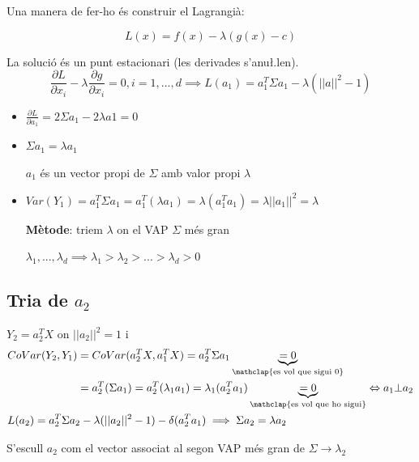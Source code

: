 Una manera de fer-ho és construir el Lagrangià:

$$  
L(x) = f(x) - \lambda(g(x) - c)  
$$

La solució és un punt estacionari (les derivades s'anu\l.len).
$$  
\frac{\partial L}{\partial x_i} - \lambda \frac{\partial g}{\partial x_i} = 0, i = 1, ..., d \implies 
L(a_1) = a_1^T\Sigma a_1 - \lambda(||a||^2 - 1)  
$$

\begin{itemize}
	\item $\frac{\partial L}{\partial a_1} = 2\Sigma a_1 - 2\lambda a1 = 0$
	\item $\Sigma a_1 = \lambda a_1$
	
	$a_1$ és un vector propi de $\Sigma$ amb valor propi $\lambda$
	\item $Var(Y_1) = a_1^T\Sigma a_1=a_1^T(\lambda a_1) = \lambda(a_1^T a_1) = \lambda ||a_1||^2 = \lambda$
	
	\textbf{Mètode}: triem $\lambda$ on el VAP $\Sigma$ més gran
	
	$\lambda_1, ..., \lambda_d \implies \lambda_1 > \lambda_2 > ... > \lambda_d > 0$
\end{itemize}

\subsection{Tria de $a_2$}

$Y_2 = a_2^TX$ on $||a_2||^2 = 1$ i 
\begin{align*}
	& 
	\begin{aligned}
		CoVar(Y_2, Y_1) &= CoVar(a_2^TX, a_1^TX) = a_2^T\Sigma a_1 
		\underbrace{= 0}_{\mathclap{\text{es vol que sigui 0}}} \\
		& = a_2^T(\Sigma a_1) = a_2^T(\lambda_1 a_1) = \lambda_1 (a_2^Ta_1) 
		\underbrace{= 0}_{\mathclap{\text{es vol que ho sigui}}} \Leftrightarrow a_1 \bot a_2
	\end{aligned} \\
	& L(a_2) = a_2^T\Sigma a_2 - \lambda(||a_2||^2 - 1) - \delta(a_2^Ta_1) \implies \Sigma a_2 = \lambda a_2
\end{align*}

S'escull $a_2$ com el vector associat al segon VAP més gran de $\Sigma \rightarrow \lambda_2$

